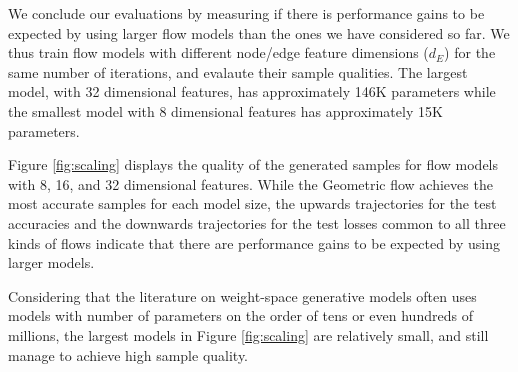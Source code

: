 We conclude our evaluations by measuring if there is performance gains to be expected by using larger flow models than the ones we have considered so far. We thus train flow models with different node/edge feature dimensions ($d_E$) for the same number of iterations, and evalaute their sample qualities. The largest model, with 32 dimensional features, has approximately 146K parameters while the smallest model with 8 dimensional features has approximately 15K parameters. 

Figure \ref{fig:scaling} displays the quality of the generated samples for flow models with 8, 16, and 32 dimensional features. While the Geometric flow achieves the most accurate samples for each model size, the upwards trajectories for the test accuracies and the downwards trajectories for the test losses common to all three kinds of flows indicate that there are performance gains to be expected by using larger models. 

Considering that the literature on weight-space generative models often uses models with number of parameters on the order of tens or even hundreds of millions, the largest models in Figure \ref{fig:scaling} are relatively small, and still manage to achieve high sample quality. 

